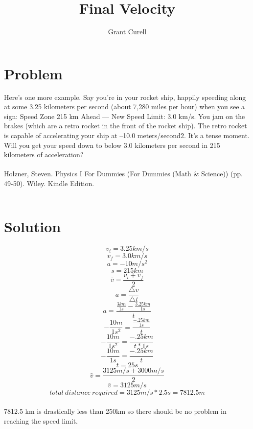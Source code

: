\documentclass{article}
\title{Final Velocity}
\author{Grant Curell}
\begin{document}
\maketitle{}
\section{Problem}
Here’s one more example. Say you’re in your rocket ship, happily speeding along at some 3.25 kilometers per second (about 7,280 miles per hour) when you see a sign: Speed Zone 215 km Ahead — New Speed Limit: 3.0 km/s. You jam on the brakes (which are a retro rocket in the front of the rocket ship). The retro rocket is capable of accelerating your ship at –10.0 meters/second2. It’s a tense moment. Will you get your speed down to below 3.0 kilometers per second in 215 kilometers of acceleration?
\\\\
Holzner, Steven. Physics I For Dummies (For Dummies (Math \& Science)) (pp. 49-50). Wiley. Kindle Edition.
\\\\
\section{Solution}
\[ v_i=3.25km/s \]
\[ v_f=3.0km/s \]
\[ a=-10m/s^2 \]
\[ s=215km \]
\[ \bar{v}=\frac{v_i+v_f}{2} \]
\[ a=\frac{\triangle{v}}{\triangle{t}} \]
\[ a=\frac{\frac{3km}{1s}-\frac{3.25km}{1s}}{t} \]
\[-\frac{10m}{1s^2}=\frac{\frac{-.25km}{1s}}{t} \]
\[-\frac{10m}{1s^2}=\frac{-.25km}{t*1s} \]
\[-\frac{10m}{1s}=\frac{-.25km}{t} \]
\[t=25s\]
\[ \bar{v}=\frac{3125m/s+3000m/s}{2} \]
\[ \bar{v}=3125m/s \]
\[ total\ distance\ required = 3125m/s * 2.5s = 7812.5m \]
\\
7812.5 km is drastically less than 250km so there should be no problem in reaching the speed limit.
\end{document}

